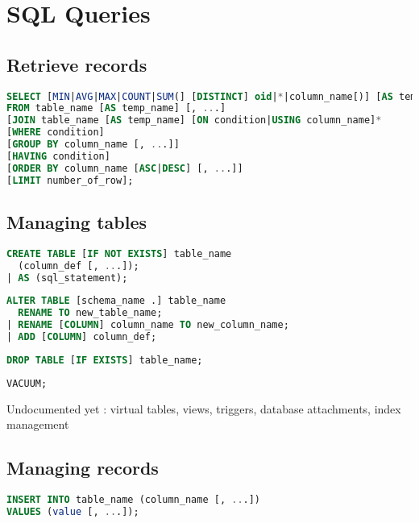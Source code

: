 \documentclass{hibiscus}
\begin{document}
\section{SQL Queries}

\subsection{Retrieve records}

\begin{lstlisting}[language=SQL]
SELECT [MIN|AVG|MAX|COUNT|SUM(] [DISTINCT] oid|*|column_name[)] [AS temp_name] [, ...]
FROM table_name [AS temp_name] [, ...]
[JOIN table_name [AS temp_name] [ON condition|USING column_name]*
[WHERE condition]
[GROUP BY column_name [, ...]]
[HAVING condition]
[ORDER BY column_name [ASC|DESC] [, ...]]
[LIMIT number_of_row];
\end{lstlisting}

\subsection{Managing tables}

\begin{lstlisting}[language=SQL]
CREATE TABLE [IF NOT EXISTS] table_name
  (column_def [, ...]);
| AS (sql_statement);
\end{lstlisting}

\begin{lstlisting}[language=SQL]
ALTER TABLE [schema_name .] table_name
  RENAME TO new_table_name;
| RENAME [COLUMN] column_name TO new_column_name;
| ADD [COLUMN] column_def;
\end{lstlisting}

\begin{lstlisting}[language=SQL]
DROP TABLE [IF EXISTS] table_name;
\end{lstlisting}

\begin{lstlisting}[language=SQL]
VACUUM;
\end{lstlisting}

Undocumented yet : virtual tables, views, triggers, database attachments, index management %

\subsection{Managing records}

\begin{lstlisting}[language=SQL]
INSERT INTO table_name (column_name [, ...])
VALUES (value [, ...]);
\end{lstlisting}
\end{document}
